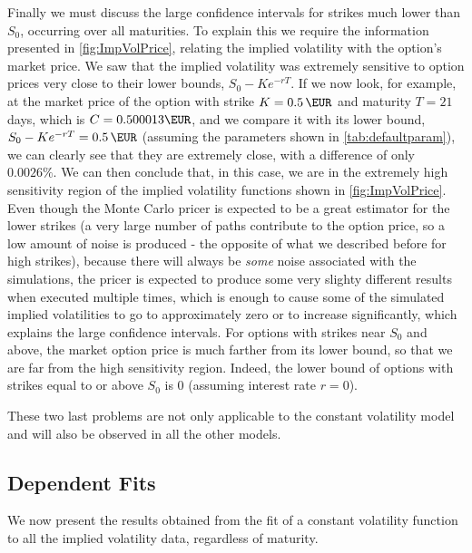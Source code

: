 Finally we must discuss the large confidence intervals for strikes much lower than $S_0$, occurring over all maturities. To explain this we require the information presented in \autoref{fig:ImpVolPrice}, relating the implied volatility with the option's market price. We saw that the implied volatility was extremely sensitive to option prices very close to their lower bounds, $S_0-Ke^{-rT}$. If we now look, for example, at the market price of the option with strike $K=\SI{0.5}{\EUR}$ and maturity $T=21$ days, which is $C=0.500013\SI{}{\EUR}$, and we compare it with its lower bound, $S_0-Ke^{-rT}=\SI{0.5}{\EUR}$ (assuming the parameters shown in \autoref{tab:defaultparam}), we can clearly see that they are extremely close, with a difference of only $0.0026\%$. We can then conclude that, in this case, we are in the extremely high sensitivity region of the implied volatility functions shown in \autoref{fig:ImpVolPrice}.
Even though the Monte Carlo pricer is expected to be a great estimator for the lower strikes (a very large number of paths contribute to the option price, so a low amount of noise is produced - the opposite of what we described before for high strikes), because there will always be \emph{some} noise associated with the simulations, the pricer is expected to produce some very slighty different results when executed multiple times, which is enough to cause some of the simulated implied volatilities to go to approximately zero or to increase significantly, which explains the large confidence intervals. For options with strikes near $S_0$ and above, the market option price is much farther from its lower bound, so that we are far from the high sensitivity region. Indeed, the lower bound of options with strikes equal to or above $S_0$ is 0 (assuming interest rate $r=0$).

These two last problems are not only applicable to the constant volatility model and will also be observed in all the other models.




\newpage

\subsection{Dependent Fits}
We now present the results obtained from the fit of a constant volatility function to all the implied volatility data, regardless of maturity.

